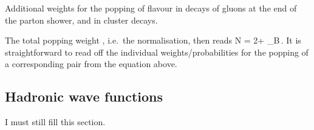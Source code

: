 \documentclass[a4paper,fleqn,10pt]{article}
\begin{document}
\begin{appendix}
\begin{table}[h!]
\begin{center}
    \parbox{12cm}{\caption{Additional weights for the popping of flavour in 
      decays of gluons at the end of the parton shower, and in 
      cluster decays.}}
  \end{center}
\end{table}
The total popping weight , i.e.\ the normalisation, then reads
\beq
{\cal N} = 2 + 
\kappa_B\,.
\eeq
It is straightforward to read off the individual weights/probabilities 
for the popping of a corresponding pair from the equation above.

\subsection{Hadronic wave functions}
\label{Sec::Wavefunctions}
I must still fill this section.


\end{appendix}
\end{document}
